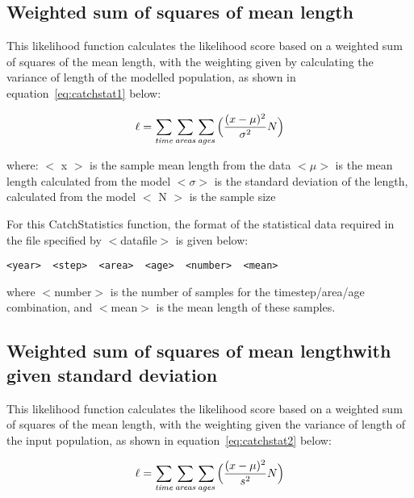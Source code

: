 \documentclass [a4paper, 10pt]{book}
\begin{document}
\subsection{Weighted sum of squares of mean length}
This likelihood function calculates the likelihood score based on a weighted sum of squares of the mean length, with the weighting given by calculating the variance of length of the modelled population, as shown in equation~\ref{eq:catchstat1} below:

\begin{equation}\label{eq:catchstat1}
\ell = \sum_{\it time}\sum_{\it areas}\sum_{\it ages} \Big(\frac{(x-\mu)^2} {\sigma^2} N\Big)
\end{equation}

where:\newline
$<$ x $>$ is the sample mean length from the data\newline
$<\mu>$ is the mean length calculated from the model\newline
$<\sigma>$ is the standard deviation of the length, calculated from the model\newline
$<$ N $>$ is the sample size

\bigskip
For this CatchStatistics function, the format of the statistical data required in the file specified by $<$datafile$>$ is given below:

{\small\begin{verbatim}
<year>  <step>  <area>  <age>  <number>  <mean>
\end{verbatim}}

where $<$number$>$ is the number of samples for the timestep/area/age combination, and $<$mean$>$ is the mean length of these samples.

\subsection{Weighted sum of squares of mean length\newline with given standard deviation}
This likelihood function calculates the likelihood score based on a weighted sum of squares of the mean length, with the weighting given the variance of length of the input population, as shown in  equation~\ref{eq:catchstat2} below:

\begin{equation}\label{eq:catchstat2}
\ell = \sum_{\it time}\sum_{\it areas}\sum_{\it ages} \Big(\frac{(x-\mu)^2} {s^2} N\Big)
\end{equation}
\end{document}
